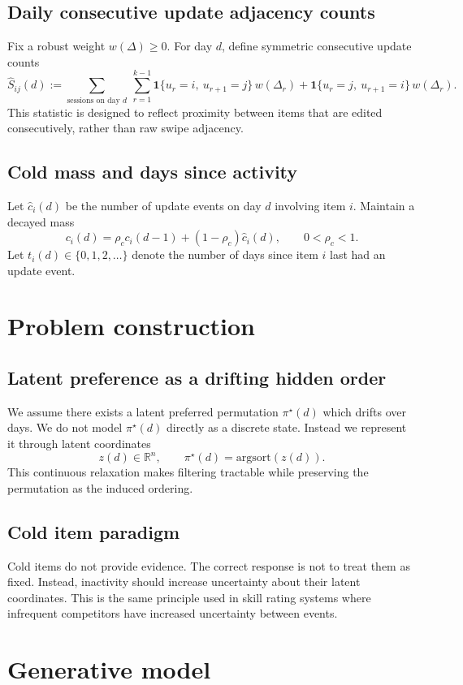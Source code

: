 \documentclass[11pt]{article}
\begin{document}
\subsection{Daily consecutive update adjacency counts}
Fix a robust weight $w(\Delta)\ge 0$.
For day $d$, define symmetric consecutive update counts
\[
\widehat S_{ij}(d)
:=
\sum_{\text{sessions on day }d}\ \sum_{r=1}^{k-1}
\mathbf{1}\{u_r=i,\ u_{r+1}=j\}\,w(\Delta_r)
+
\mathbf{1}\{u_r=j,\ u_{r+1}=i\}\,w(\Delta_r).
\]
This statistic is designed to reflect proximity between items that are edited consecutively, rather than raw swipe adjacency.

\subsection{Cold mass and days since activity}
Let $\widehat c_i(d)$ be the number of update events on day $d$ involving item $i$.
Maintain a decayed mass
\[
c_i(d) = \rho_c c_i(d-1) + (1-\rho_c)\widehat c_i(d),
\qquad 0<\rho_c<1.
\]
Let $t_i(d)\in\{0,1,2,\dots\}$ denote the number of days since item $i$ last had an update event.

\section{Problem construction}

\subsection{Latent preference as a drifting hidden order}
We assume there exists a latent preferred permutation $\pi^\star(d)$ which drifts over days.
We do not model $\pi^\star(d)$ directly as a discrete state.
Instead we represent it through latent coordinates
\[
z(d)\in\mathbb R^n,
\qquad
\pi^\star(d) = \mathrm{argsort}(z(d)).
\]
This continuous relaxation makes filtering tractable while preserving the permutation as the induced ordering.

\subsection{Cold item paradigm}
Cold items do not provide evidence.
The correct response is not to treat them as fixed.
Instead, inactivity should increase uncertainty about their latent coordinates.
This is the same principle used in skill rating systems where infrequent competitors have increased uncertainty between events.

\section{Generative model}
\end{document}
